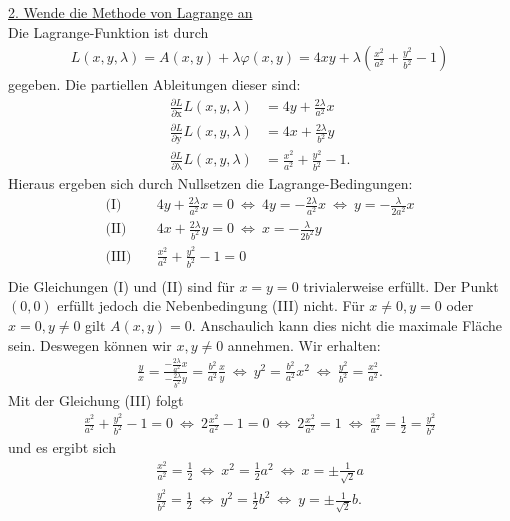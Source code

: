 \underline{2. Wende die Methode von Lagrange an}\\
Die Lagrange-Funktion ist durch
\begin{align*}
	L(x,y,\lambda) 
	= A(x,y) + \lambda\varphi(x,y)
	= 4xy + \lambda \left(\frac{x^2}{a^2} + \frac{y^2}{b^2} - 1\right)
\end{align*}
gegeben. Die partiellen Ableitungen dieser sind:
\begin{align*}
	\frac{\partial L}{\partial \mathrm{x}}L(x,y,\lambda)
	&= 4 y + \frac{2\lambda}{a^2} x \\
	\frac{\partial L}{\partial \mathrm{y}}L(x,y,\lambda)
	&= 4 x + \frac{2\lambda}{b^2} y \\
	\frac{\partial L}{\partial \mathrm{\lambda}}L(x,y,\lambda)
	&= \frac{x^2}{a^2} + \frac{y^2}{b^2} - 1.
\end{align*}
Hieraus ergeben sich durch Nullsetzen die Lagrange-Bedingungen:
\begin{align*}
	\textrm{(I)}& \quad 
	4 y + \frac{2\lambda}{a^2} x = 0
	\ \Leftrightarrow \ 4y = - \frac{2\lambda}{a^2} x 
	\ \Leftrightarrow \ y = -\frac{\lambda}{2a^2} x
	\\
	\textrm{(II)}& \quad 
	4 x + \frac{2\lambda}{b^2} y = 0
	\ \Leftrightarrow \
	x = - \frac{\lambda}{2 b^2} y 
	\\
	\textrm{(III)}& \quad 
	\frac{x^2}{a^2} + \frac{y^2}{b^2} - 1 = 0\\
\end{align*}
Die Gleichungen (I) und (II) sind für $ x = y = 0 $ trivialerweise erfüllt.
Der Punkt $ (0,0)  $ erfüllt jedoch die Nebenbedingung (III) nicht.
Für $ x \neq 0, y = 0$ oder $ x = 0, y \neq 0 $ gilt $ A(x,y) = 0 $.
Anschaulich kann dies nicht die maximale Fläche sein. Deswegen können wir $ x,y \neq 0 $ annehmen. Wir erhalten:
\begin{align*}
	\frac{y}{x} = \frac{-\frac{2 \lambda}{a^2} x}{- \frac{2\lambda}{b^2} y}
	= 
	\frac{b^2}{a^2} \frac{x}{y}
	\
	\Leftrightarrow \
	y^2 = \frac{b^2}{a^2} x^2
	\ \Leftrightarrow \
	\frac{y^2}{b^2} = \frac{x^2}{a^2}.
\end{align*}
Mit der Gleichung (III) folgt
\begin{align*}
	\frac{x^2}{a^2} + \frac{y^2}{b^2} - 1 = 0
	\ \Leftrightarrow \
	2 \frac{x^2}{a^2}  -1 = 0
	\ \Leftrightarrow \
	2 \frac{x^2}{a^2}   = 1
	\ \Leftrightarrow \
	\frac{x^2}{a^2} = \frac{1}{2} = \frac{y^2}{b^2}
\end{align*}
und es ergibt sich 
\begin{align*}
	\frac{x^2}{a^2} = \frac{1}{2} 
	 \ \Leftrightarrow \ 
	 x^2  = \frac{1}{2} a^2
	 \ \Leftrightarrow \
	 x = \pm \frac{1}{\sqrt{2}} a\\
	 \frac{y^2}{b^2} = \frac{1}{2} 
	 \ \Leftrightarrow \ 
	 y^2  = \frac{1}{2} b^2
	 \ \Leftrightarrow \
	 y = \pm \frac{1}{\sqrt{2}} b.
\end{align*}
